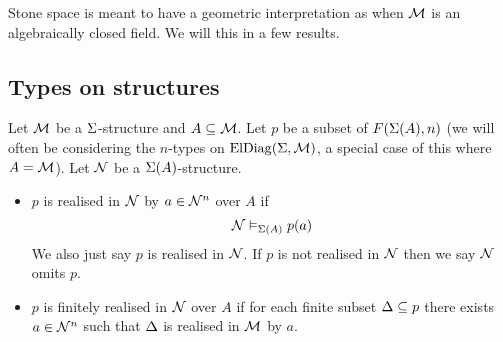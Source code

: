 Stone space is meant to have a geometric interpretation as 
when $\mathcal{M}$ is an algebraically closed field.
We will this in a few results.

\subsection{Types on structures}
\begin{dfn}[Realisation]
    Let $\mathcal{M}$ be a $\Sigma$-structure and $A \subseteq {\mathcal{M}}$.
    Let $p$ be a subset of $F(\Sigma(A),n)$
    (we will often be considering the $n$-types on $\mathrm{ElDiag}(\Sigma,\mathcal{M})$,
    a special case of this where $A = {\mathcal{M}}$).
    Let $\mathcal{N}$ be a $\Sigma(A)$-structure.
    \begin{itemize}
        \item $p$ is realised in $\mathcal{N}$ by $a \in {\mathcal{N}}^n$ over $A$ if
            \[\mathcal{N} \vDash_{\Sigma(A)} p(a)\]
            We also just say $p$ is realised in $\mathcal{N}$.
            If $p$ is not realised in $\mathcal{N}$
            then we say $\mathcal{N}$ omits $p$.
        \item $p$ is finitely realised in $\mathcal{N}$ 
            over $A$ if for each finite subset $\Delta \subseteq p$ 
            there exists $a \in {\mathcal{N}}^n$
            such that $\Delta$ is realised in $\mathcal{M}$ by $a$.
    \end{itemize}
\end{dfn}

